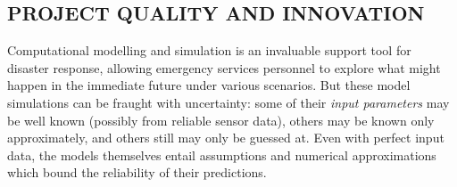 \subsection*{PROJECT QUALITY AND INNOVATION}



Computational modelling and simulation is an invaluable support tool
for disaster response, allowing emergency services personnel to
explore what might happen in the immediate future under various
scenarios. But these model simulations can be fraught with
uncertainty: some of their \emph{input parameters} may be well known
(possibly from reliable sensor data), others may be known only
approximately, and others still may only be guessed at. Even with
perfect input data, the models themselves entail assumptions and
numerical approximations which bound the reliability of their
predictions.

